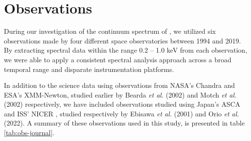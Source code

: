 \section{Observations}
	During our investigation of the continuum spectrum of \source, we utilized six observations made by four different space observatories between 1994 and 2019.
	By extracting spectral data within the range 0.2 -- 1.0 keV from each observation, we were able to apply a consistent spectral analysis approach across a broad temporal range and disparate instrumentation platforms.
		
	In addition to the science data using observations from NASA's Chandra and ESA's XMM-Newton, studied earlier by Bearda \textit{et al.} (2002) and Motch \textit{et al.} (2002) respectively, we have included observations studied using Japan's ASCA \cite{ebisawaAsca2001ApJ} and ISS' NICER \cite{orioNicer2022ApJ}, studied respectively by Ebisawa \textit{et al.} (2001) and Orio \textit{et al.} (2022). A summary of these observations used in this study, %
	is presented in table \ref{tab:obs-journal}. %
